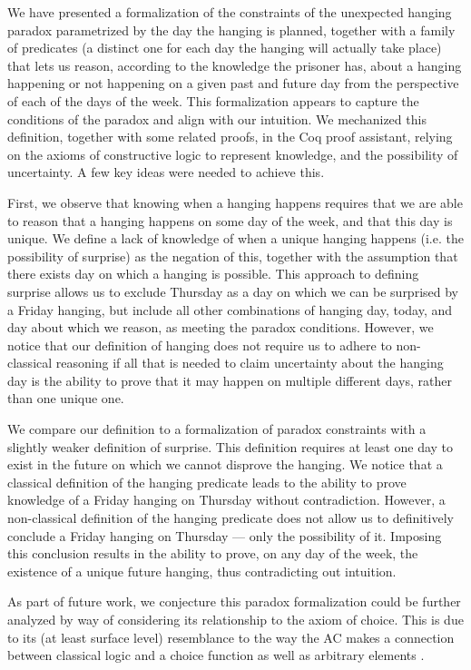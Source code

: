 \documentclass[runningheads]{llncs}
\begin{document}
We have presented a formalization of the constraints of the unexpected hanging paradox
parametrized by the day the hanging is planned,
together with a family of predicates (a distinct one for each day the hanging
will actually take place) that lets us reason, according to the knowledge the prisoner has,
about a hanging happening or not happening on
a given past and future day from the perspective of each of the days of the week.
This formalization appears to capture the
conditions of the paradox and align with our intuition.
We mechanized this definition, together with some related proofs, in the Coq
proof assistant, relying on the axioms of constructive logic to represent knowledge,
and the possibility of uncertainty.
A few key ideas were needed to achieve this.

First, we observe that knowing when a hanging happens requires that we are able to
reason that a hanging happens on some day of the week, and that this day is unique.
We define a lack of knowledge of when a unique hanging happens (i.e. the possibility of surprise)
as the negation of this,
together with the assumption that there exists day on which a hanging is possible.
This approach to defining surprise allows us to exclude Thursday
as a day on which we can be surprised by a Friday hanging, but include all other
combinations of hanging day, today, and day about which we reason, as meeting
the paradox conditions. However, we notice that
our definition of hanging does not require us to adhere to non-classical
reasoning if all that is needed to claim uncertainty about the hanging day
is the ability to prove that it may happen on multiple different days, rather than one unique one.

We compare our definition to a formalization of paradox constraints with a slightly
weaker definition of surprise. This definition requires at least one day to
exist in the future on which we cannot disprove the hanging. We notice that a classical
definition of the hanging predicate leads to the ability to prove knowledge of a
Friday hanging on Thursday without contradiction. However, a non-classical
definition of the hanging predicate does not allow us to definitively conclude a Friday hanging
on Thursday --- only the possibility of it. Imposing this conclusion results in
the ability to prove, on any day of the week, the existence of a unique future hanging, thus contradicting
out intuition.

As part of future work, we conjecture this paradox formalization could be further analyzed by way of considering its
relationship to the axiom of choice. This is due to its (at least surface level)
resemblance to the way the AC makes a connection between classical logic
and a choice function \cite{accomp} as well as arbitrary elements \cite{randomness}.
\end{document}
